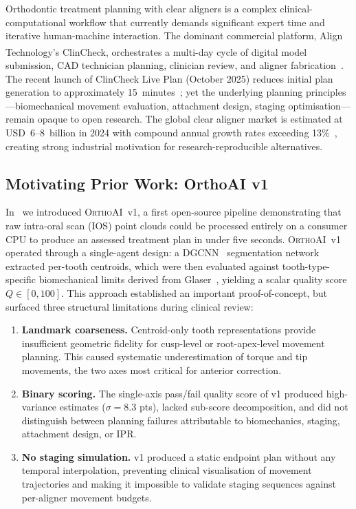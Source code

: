 \documentclass[10pt,twocolumn]{article}
\newcommand{\orthoai}{\textsc{OrthoAI}}
\newcommand{\dgcnn}{\textsc{DGCNN}}
\newcommand{\vone}{\orthoai{}~v1}
\begin{document}
Orthodontic treatment planning with clear aligners is a complex
clinical-computational workflow that currently demands significant expert time
and iterative human-machine interaction.
The dominant commercial platform, Align Technology's
ClinCheck\textsuperscript{\textregistered}, orchestrates a multi-day cycle of
digital model submission, CAD technician planning, clinician review, and aligner
fabrication~\cite{glaser2017invisalign}.
The recent launch of ClinCheck Live Plan (October 2025) reduces initial plan
generation to approximately 15~minutes~\cite{align2025liveplan}; yet the
underlying planning principles---biomechanical movement evaluation,
attachment design, staging optimisation---remain opaque to open research.
The global clear aligner market is estimated at USD~6--8~billion in 2024
with compound annual growth rates exceeding 13\%~\cite{litreview2026},
creating strong industrial motivation for research-reproducible alternatives.

\subsection{Motivating Prior Work: OrthoAI v1}

In~\cite{lansiaux2026orthoaiv1} we introduced \vone{}, a first open-source
pipeline demonstrating that raw intra-oral scan (IOS) point clouds could be
processed entirely on a consumer CPU to produce an assessed treatment plan
in under five seconds.
\vone{} operated through a single-agent design:
a \dgcnn{}~\cite{wang2019dgcnn} segmentation network extracted per-tooth
centroids, which were then evaluated against tooth-type-specific
biomechanical limits derived from Glaser~\cite{glaser2017invisalign},
yielding a scalar quality score $Q \in [0, 100]$.
This approach established an important proof-of-concept, but surfaced
three structural limitations during clinical review:

\begin{enumerate}[nosep,leftmargin=1.5em]
  \item \textbf{Landmark coarseness.}
    Centroid-only tooth representations provide insufficient geometric
    fidelity for cusp-level or root-apex-level movement planning.
    This caused systematic underestimation of torque and tip movements,
    the two axes most critical for anterior correction.
  \item \textbf{Binary scoring.}
    The single-axis pass/fail quality score of v1 produced high-variance
    estimates ($\sigma = 8.3$ pts), lacked sub-score decomposition, and
    did not distinguish between planning failures attributable to
    biomechanics, staging, attachment design, or IPR.
  \item \textbf{No staging simulation.}
    v1 produced a static endpoint plan without any temporal interpolation,
    preventing clinical visualisation of movement trajectories and making
    it impossible to validate staging sequences against per-aligner movement
    budgets.
\end{enumerate}
\end{document}
